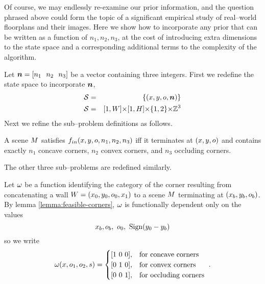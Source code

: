Of course, we may endlessly re-examine our prior information, and the
question phrased above could form the topic of a significant empirical
study of real--world floorplans and their images. Here we show how to
incorporate any prior that can be written as a function of
$n_1,n_2,n_3$, at the cost of introducing extra dimensions to the
state space and a corresponding additional terms to the complexity of
the algorithm.

Let $\Counts=[n_1~~n_2~~n_3]$ be a vector containing three
integers. First we redefine the state space to incorporate $\Counts$,
\begin{eqnarray}
  \StateSpace &=& \{(x,y,\WallOrient,\Counts)\}\\
  \StateSpace &=& [1,\Width] \cross [1,\Height] \cross \{1,2\} \cross \Ints^3
\end{eqnarray}
Next we refine the sub--problem definitions as follows. 
\begin{definition}
  A scene $\Scene$ satisfies $\SubProbIN(x,y,\WallOrient,n_1,n_2,n_3)$
  iff it terminates at $(x,y,\WallOrient)$ and contains exactly $n_1$
  concave corners, $n_2$ convex corners, and $n_3$ occluding
  corners.
\end{definition}
The other three sub--problems are redefined similarly.

Let $\CategoryFunc$ be a function identifying the
category of the corner resulting from concatenating a wall
$\Wall=(x_0,y_0,\WallOrient_0,x_1)$ to a scene $\Scene$ terminating at
$(x_b,y_b,\WallOrient_b)$. By lemma \ref{lemma:feasible-corners},
$\CategoryFunc$ is functionally dependent only on the values
\begin{equation}
  x_b, \WallOrient_b, ~\WallOrient_0, ~\sign(y_0-y_b)
\end{equation}
so we write
\begin{equation}
  \CategoryFunc(x,\WallOrient_1,\WallOrient_2,s) =
  \begin{cases}
    [1 ~ 0 ~ 0], & \mbox{for concave corners}\\
    [0 ~ 1 ~ 0], & \mbox{for convex corners}\\
    [0 ~ 0 ~ 1], & \mbox{for occluding corners}\\
  \end{cases}~.
\end{equation}

